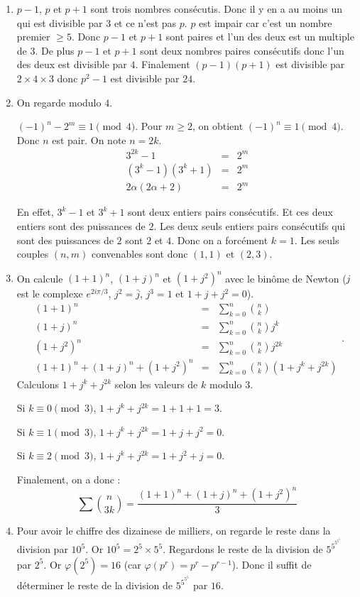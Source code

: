 \documentclass[10pt,a4paper]{article}
\begin{document}
\begin{enumerate}
\bigskip
\item $p-1$, $p$ et $p+1$ sont trois nombres consécutis. Donc il y en a au moins un qui est divisible par $3$ et ce n'est pas $p$. $p$ est impair car c'est un
nombre premier $\geqslant 5$. Donc $p-1$ et $p+1$ sont paires et l'un des deux est un multiple de $3$. De plus $p-1$ et $p+1$ sont deux nombres paires 
consécutifs donc l'un des deux est divisible par $4$. Finalement $(p-1)(p+1)$ est divisible par $2\times 4\times 3$ donc $p^2-1$ est divisible par $24$.
\bigskip
\item On regarde modulo $4$.

$(-1)^n-2^m\equiv 1\pmod{4}$. Pour $m\geqslant 2$, on obtient $(-1)^n\equiv 1 \pmod{4}$. Donc $n$ est pair. On note $n=2k$.
$$
\begin{array}{rcl}
3^{2k}-1&=&2^m\\
(3^k-1)(3^k+1)&=&2^m\\
2\alpha(2\alpha+2)&=&2^m
\end{array}$$

En effet, $3^k-1$ et $3^k+1$ sont deux entiers pairs consécutifs. Et ces deux entiers sont des puissances de $2$. Les deux seuls entiers pairs consécutifs qui
sont des puissances de $2$ sont $2$ et $4$. Donc on a forcément $k=1$. Les seuls couples $(n,m)$ convenables sont donc $(1,1)$ et $(2,3)$.
\bigskip
\item On calcule $(1+1)^n$, $(1+j)^n$ et $(1+j^2)^n$ avec le binôme de Newton ($j$ est le complexe $e^{2i\pi/3}$, $j^2=\bar{j}$, $j^3=1$ et $1+j+j^2=0$).
$$\begin{array}{rcl}
(1+1)^n&=&\sum\limits_{k=0}^n\binom{n}{k} \\
(1+j)^n &=&\sum\limits_{k=0}^n\binom{n}{k}j^k \\
(1+j^2)^n&=&\sum\limits_{k=0}^n\binom{n}{k}j^{2k}\\
(1+1)^n+(1+j)^n+(1+j^2)^n&=&\sum\limits_{k=0}^n\binom{n}{k}(1+j^k+j^{2k})
\end{array}. $$
Calculons $1+j^k+j^{2k}$ selon les valeurs de $k$ modulo 3.

Si $k\equiv 0 \pmod{3}$, $1+j^k+j^{2k}=1+1+1=3$.

Si $k\equiv 1\pmod{3}$, $1+j^k+j^{2k}=1+j+j^2=0$.

Si $k\equiv 2\pmod{3}$, $1+j^k+j^{2k}=1+j^2+j=0$.

Finalement, on a donc :
$$\sum\binom{n}{3k}=\frac{(1+1)^n+(1+j)^n+(1+j^2)^n}{3}$$
\bigskip
\item
Pour avoir le chiffre des dizainese de milliers, on regarde le reste dans la division par $10^5$. Or $10^5=2^5\times 5^5$.
Regardons le reste de la division de $5^{5^{5^{5^{5}}}}$ par $2^5$. Or $\varphi(2^5)=16$ (car $\varphi(p^r)=p^r-p^{r-1}$). Donc il suffit de déterminer le reste
de la division de $5^{5^{5^{5}}}$ par $16$.


\end{enumerate}
\end{document}
